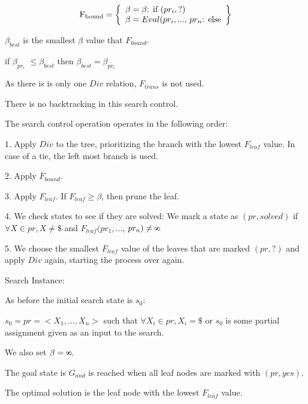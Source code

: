 \documentclass[10pt]{article}
\def\infinity{\rotatebox{90}{8}}
\begin{document}
 \[
          \text{F\textsubscript{bound}} = \left\{\begin{array}{ll}
          \beta = \beta$: if $(pr_i, ?)\\

           \beta = Eval(pr_i, ... $, $pr_n $: else$\\
           
            
            \end{array}\right\}
      \]
      
\bigskip

$\beta _{best}$ is the smallest $\beta$ value that $F_{bound}$.

if $\beta _{pr_i}$ $\leq \beta _{best}$ then $\beta_ {best} = \beta _{pr_i } $





\bigskip
\bigskip

As there is is only one $Div$ relation, $F_{trans}$ is not used. 

There is no backtracking in this search control.

\bigskip
\bigskip
\bigskip

The search control operation operates in the following order:

\bigskip


1. Apply $Div$ to the tree, prioritizing the branch with the lowest $F_{leaf}$ value. In case of a tie, the left most branch is used. 

2. Apply $F_{bound}$.  

3. Apply $F_{leaf}$. If $F_{leaf} \geq \beta $, then prune the leaf.

4. We check states to see if they are solved: We mark a state as $(pr, solved)$ if $\forall X \in pr, X \neq \$ $ and $F_{leaf}(pr_1, ... $, $pr_n) \neq \infinity$


5. We choose the smallest $F_{leaf}$ value of the leaves that are marked $(pr, ?)$  and apply $Div$ again, starting the process over again.

\bigskip
\bigskip
\bigskip
\bigskip
 
Search Instance:

As before the initial search state is $s_0$:

\bigskip

$s_0 = pr = <X_1, ..., X_n> $ such that $\forall X_i \in pr, X_i = \$ $ 
or $s_0$ is some partial assignment given as an input to the search.

We also set $\beta = \infinity$.
\bigskip

The goal state is $G_{and}$ is reached when all leaf nodes are marked with $(pr, yes)$.

\bigskip

The optimal solution is the leaf node with the lowest $F_{leaf}$ value.
\huge




 
\end{document}

